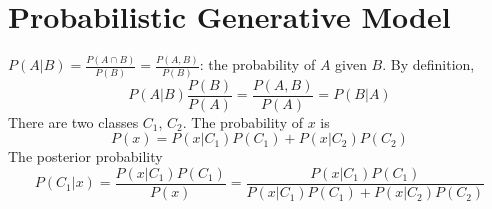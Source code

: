 \documentclass[../main.tex]{subfiles}
\begin{document}
    \section{Probabilistic Generative Model}
        $P(A|B)=\frac{P(A\cap B)}{P(B)}=\frac{P(A,B)}{P(B)}$: the probability of $A$ given $B$. By definition,
        \[
            P(A|B)\frac{P(B)}{P(A)}=\frac{P(A,B)}{P(A)}=P(B|A)
        \]
        There are two classes $C_1$, $C_2$. The probability of $x$ is
        \[
            P(x)=P(x|C_1)P(C_1)+P(x|C_2)P(C_2)
        \]
        The posterior probability
        \[
            P(C_1|x)=\frac{P(x|C_1)P(C_1)}{P(x)}=\frac{P(x|C_1)P(C_1)}{P(x|C_1)P(C_1)+P(x|C_2)P(C_2)}
        \]
\end{document}
